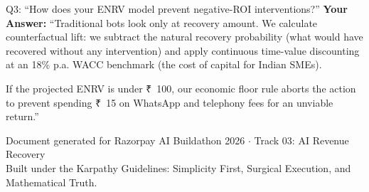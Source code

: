 \documentclass[11pt, a4paper]{article}
\newcommand{\INR}{{\rupeefont ₹}}
\begin{document}
\begin{calloutbox}{Q3: ``How does your ENRV model prevent negative-ROI interventions?''}
\textbf{Your Answer:}
``Traditional bots look only at recovery amount. We calculate counterfactual lift: we subtract the natural recovery probability (what would have recovered without any intervention) and apply continuous time-value discounting at an 18\% p.a. WACC benchmark (the cost of capital for Indian SMEs). 

If the projected ENRV is under \INR~100, our economic floor rule aborts the action to prevent spending \INR~15 on WhatsApp and telephony fees for an unviable return.''
\end{calloutbox}

\vfill
\begin{center}
  \footnotesize\color{gray}
  Document generated for Razorpay AI Buildathon 2026 $\cdot$ Track 03: AI Revenue Recovery\\
  Built under the Karpathy Guidelines: Simplicity First, Surgical Execution, and Mathematical Truth.
\end{center}
\end{document}
